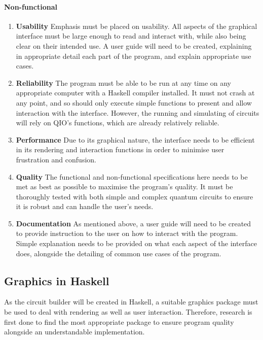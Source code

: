 \documentclass[a4paper,10pt, titlepage, twoside]{article}
\begin{document}
\paragraph{Non-functional}
\begin{enumerate}
    \item \textbf{Usability} Emphasis must be placed on usability. All aspects of the graphical interface must be large enough to read and interact with, while also being clear on their intended use. A user guide will need to be created, explaining in appropriate detail each part of the program, and explain appropriate use cases.
    \item \textbf{Reliability} The program must be able to be run at any time on any appropriate computer with a Haskell compiler installed. It must not crash at any point, and so should only execute simple functions to present and allow interaction with the interface. However, the running and simulating of circuits will rely on QIO's functions, which are already relatively reliable.
    \item \textbf{Performance} Due to its graphical nature, the interface needs to be efficient in its rendering and interaction functions in order to minimise user frustration and confusion.
    \item \textbf{Quality} The functional and non-functional specifications here needs to be met as best as possible to maximise the program's quality. It must be thoroughly tested with both simple and complex quantum circuits to ensure it is robust and can handle the user's needs.
    \item \textbf{Documentation} As mentioned above, a user guide will need to be created to provide instruction to the user on how to interact with the program. Simple explanation needs to be provided on what each aspect of the interface does, alongside the detailing of common use cases of the program.
\end{enumerate}

\subsection{Graphics in Haskell}
As the circuit builder will be created in Haskell, a suitable graphics package must be used to deal with rendering as well as user interaction. Therefore, research is first done to find the most appropriate package to ensure program quality alongside an understandable implementation.
\end{document}
